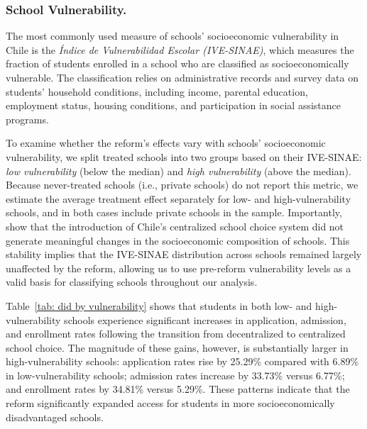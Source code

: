 \documentclass[11pt]{article}
\begin{document}


\subsubsection{School Vulnerability.} The most commonly used measure of schools' socioeconomic vulnerability in Chile is the \emph{Índice de Vulnerabilidad Escolar (IVE-SINAE)}, which measures the fraction of students enrolled in a school who are classified as socioeconomically vulnerable. The classification relies on administrative records and survey data on students' household conditions, including income, parental education, employment status, housing conditions, and participation in social assistance programs. 

To examine whether the reform's effects vary with schools' socioeconomic vulnerability, we split treated schools into two groups based on their IVE-SINAE: \emph{low vulnerability} (below the median) and \emph{high vulnerability} (above the median). Because never-treated schools (i.e., private schools) do not report this metric, we estimate the average treatment effect separately for low- and high-vulnerability schools, and in both cases include private schools in the sample. Importantly, \citet{urzua2023} show that the introduction of Chile's centralized school choice system did not generate meaningful changes in the socioeconomic composition of schools. This stability implies that the IVE-SINAE distribution across schools remained largely unaffected by the reform, allowing us to use pre-reform vulnerability levels as a valid basis for classifying schools throughout our analysis.

Table~\ref{tab: did by vulnerability} shows that students in both low- and high-vulnerability schools experience significant increases in application, admission, and enrollment rates following the transition from decentralized to centralized school choice. The magnitude of these gains, however, is substantially larger in high-vulnerability schools: application rates rise by 25.29\% compared with 6.89\% in low-vulnerability schools; admission rates increase by 33.73\% versus 6.77\%; and enrollment rates by 34.81\% versus 5.29\%. These patterns indicate that the reform significantly expanded access for students in more socioeconomically disadvantaged schools.


\end{document}
